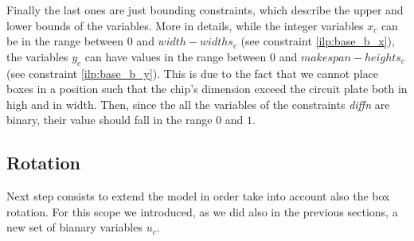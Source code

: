     Finally the last ones are just bounding constraints, which describe the upper and lower bounds
    of the variables. More in details, while the integer variables \(x_c\) can be in the range 
    between \(0\) and \(width-widths_c\) (see constraint \ref{ilp:base_b_x}), the variables \(y_c\) can have
    values in the range between \(0\) and \(makespan-heights_c\) (see constraint \ref{ilp:base_b_y}). 
    This is due to the fact that we cannot place boxes in a position such that the chip's dimension 
    exceed the circuit plate both in high and in width. Then, since the all the variables of the 
    constraints \textit{diffn} are binary, their value should fall in the range \(0\) and \(1\).

\subsection{Rotation}
    Next step consists to extend the model in order take into account also the box rotation.
    For this scope we introduced, as we did also in the previous sections, a new set of bianary 
    variables \(u_c\). 

